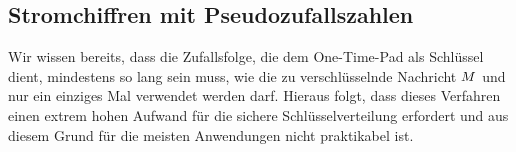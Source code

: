 \subsection{Stromchiffren mit Pseudozufallszahlen}
\label{ssec:stromchiffrenpseudozufall}
Wir wissen bereits, dass die Zufallsfolge, die dem One-Time-Pad als
Schlüssel dient, mindestens so lang sein muss, wie die zu
verschlüsselnde Nachricht $M$ und nur ein einziges Mal verwendet
werden darf. Hieraus folgt, dass dieses Verfahren einen extrem hohen
Aufwand für die sichere Schlüsselverteilung erfordert und aus diesem
Grund für die meisten Anwendungen nicht praktikabel ist. 


